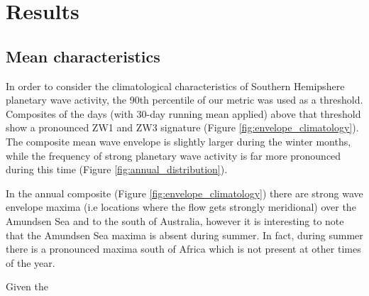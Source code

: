 \section{Results}

\subsection{Mean characteristics}

In order to consider the climatological characteristics of Southern Hemipshere planetary wave activity, the 90th percentile of our metric was used as a threshold. Composites of the days (with 30-day running mean applied) above that threshold show a pronounced ZW1 and ZW3 signature (Figure \ref{fig:envelope_climatology}). The composite mean wave envelope is slightly larger during the winter months, while the frequency of strong planetary wave activity is far more pronounced during this time (Figure \ref{fig:annual_distribution}).

In the annual composite (Figure \ref{fig:envelope_climatology}) there are strong wave envelope maxima (i.e locations where the flow gets strongly meridional) over the Amundsen Sea and to the south of Australia, however it is interesting to note that the Amundsen Sea maxima is absent during summer. In fact, during summer there is a pronounced maxima south of Africa which is not present at other times of the year.

Given the 



